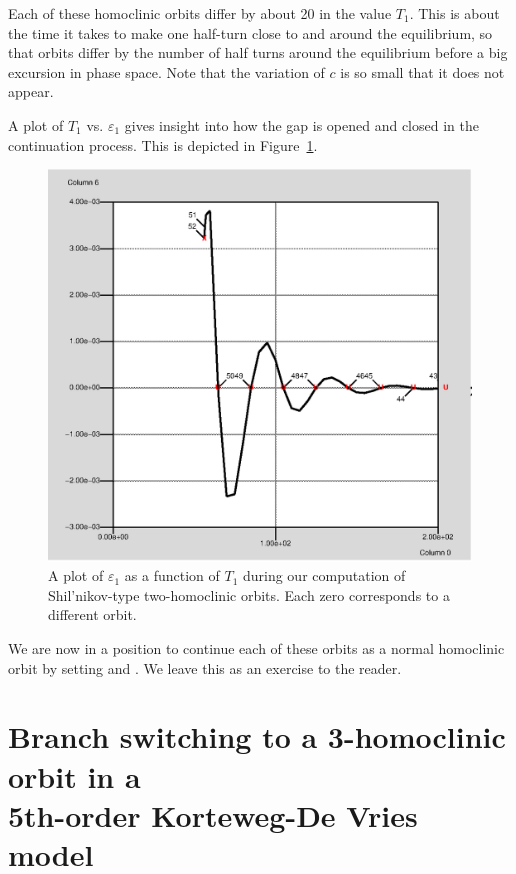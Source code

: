 \documentclass[12pt]{report}
\begin{document}
Each of these homoclinic orbits differ 
by about 20 in the value $T_1$. This is about 
the time it takes to make one half-turn close to and
around the equilibrium, so that orbits differ by the number of 
half turns around the equilibrium before a big excursion
in phase space. Note that the variation of 
$c$ is so small that it does not appear.

A plot of $T_1$ vs. $\varepsilon_1$ gives insight into how the gap
is opened and closed in the continuation process. This is depicted in 
Figure~\ref{shilgap}.
\begin{figure}[htb]
\begin{center}
\includegraphics[scale=0.5]{include/shilgap.eps}
\caption{A plot of $\varepsilon_1$ as a function of $T_1$ 
during our computation of Shil'nikov-type two-homoclinic orbits. 
Each zero corresponds to a different orbit.}
\label{shilgap}
\end{center}
\end{figure}
We are now in a
position to continue each of these orbits as a
normal homoclinic orbit by setting  and
. We leave
this as an exercise to the reader.

\section{ Branch switching to a 3-homoclinic orbit in
a\\ 5th-order Korteweg-De Vries model}
\end{document}
